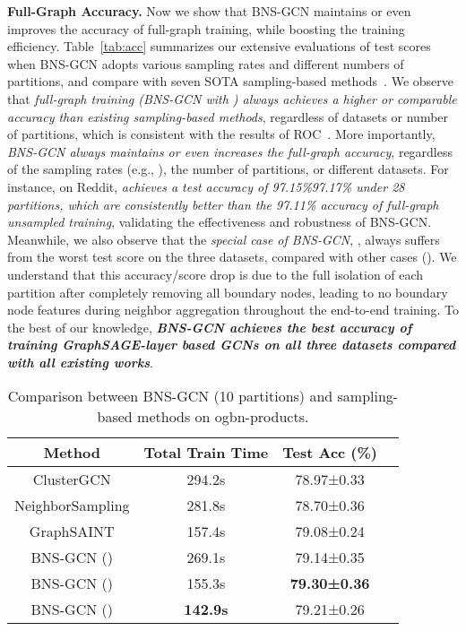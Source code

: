 \documentclass{article}
\newcommand{\niparagraph}[1]{\noindent\textbf{#1}}
\begin{document}
\niparagraph{Full-Graph Accuracy.}
Now we show that BNS-GCN maintains or even improves the accuracy of full-graph training, while boosting the training efficiency.
Table~\ref{tab:acc} summarizes our extensive evaluations of test scores when BNS-GCN adopts various sampling rates and different numbers of partitions, and compare with seven SOTA sampling-based methods~\citep{hu2020open, redditacc2020paperwithcode,chiang2019cluster,chen2018stochastic,zeng2019graphsaint,hamilton2017inductive,cong2020minimal,liu2022exact,zou2019layer,chen2020scalable}.
We observe that \textit{full-graph training (BNS-GCN with ) always achieves a higher or comparable accuracy than existing sampling-based methods}, regardless of datasets or number of partitions, which is consistent with the results of ROC~\citep{jia2020improving}.
More importantly, \textit{BNS-GCN always maintains or even increases the full-graph accuracy}, regardless of the sampling rates (e.g., ), the number of partitions, or different datasets.
For instance, on Reddit, \textit{ achieves a test accuracy of 97.15\%97.17\% under 28 partitions, which are consistently better than the 97.11\% accuracy of full-graph unsampled training}, validating the effectiveness and robustness of BNS-GCN.
Meanwhile, we also observe that the \textit{special case of BNS-GCN}, , always suffers from the worst test score on the three datasets, compared with other cases (). We understand that this accuracy/score drop is due to the full isolation of each partition after completely removing all boundary nodes, leading to no boundary node features during neighbor aggregation throughout the end-to-end training.
To the best of our knowledge, \textbf{\textit{BNS-GCN achieves the best accuracy of training GraphSAGE-layer based GCNs on all three datasets compared with all existing works}}. 



\begin{table}[t]
\centering
\caption{Comparison between BNS-GCN (10 partitions) and sampling-based methods on ogbn-products.}
\setlength{\tabcolsep}{0.4em}
\label{tab:cmp_samp}
\begin{tabular}{c|ccc}
\hline
Method & Total Train Time & Test Acc (\%) \\
\hline
ClusterGCN & 294.2s & 78.97±0.33 \\
NeighborSampling & 281.8s & 78.70±0.36 \\
GraphSAINT & 157.4s & 79.08±0.24 \\
\hline
BNS-GCN () & 269.1s & 79.14±0.35 \\
BNS-GCN () & 155.3s & \textbf{79.30±0.36} \\
BNS-GCN () & \textbf{142.9s} & 79.21±0.26 \\
\hline
\end{tabular}
\end{table}
\end{document}

